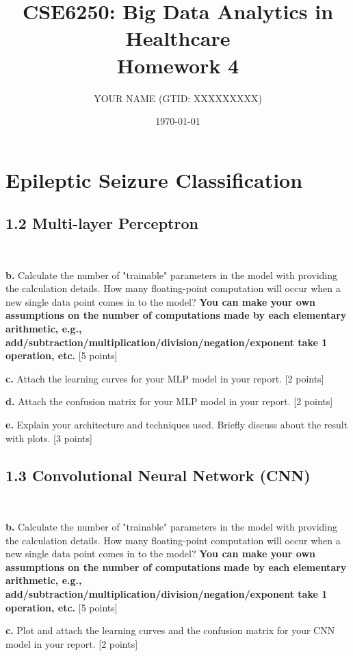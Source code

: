 \documentclass[12pt]{article}
\title{CSE6250: Big Data Analytics in Healthcare \\ Homework 4}
\author{YOUR NAME (GTID: XXXXXXXXX)}
\date{\today}
\begin{document}
\maketitle

\section{Epileptic Seizure Classification}

\subsection*{1.2 Multi-layer Perceptron}
~

\textbf{b.} Calculate the number of "trainable" parameters in the model with providing the calculation details. How many floating-point computation will occur when a new single data point comes in to the model?  \textbf{You can make your own assumptions on the number of computations made by each elementary arithmetic, e.g., add/subtraction/multiplication/division/negation/exponent take 1 operation, etc.} [5 points]

\bigskip

\textbf{c.} Attach the learning curves for your MLP model in your report. [2 points]

\bigskip

\textbf{d.} Attach the confusion matrix for your MLP model in your report. [2 points]

\bigskip
\textbf{e.} Explain your architecture and techniques used. Briefly discuss about the result with plots. [3 points]

\subsection*{1.3 Convolutional Neural Network (CNN)}
~

\textbf{b.} Calculate the number of "trainable" parameters in the model with providing the calculation details. How many floating-point computation will occur when a new single data point comes in to the model?  \textbf{You can make your own assumptions on the number of computations made by each elementary arithmetic, e.g., add/subtraction/multiplication/division/negation/exponent take 1 operation, etc.} [5 points]

\bigskip

\textbf{c.} Plot and attach the learning curves and the confusion matrix for your CNN model in your report. [2 points]
\end{document}
